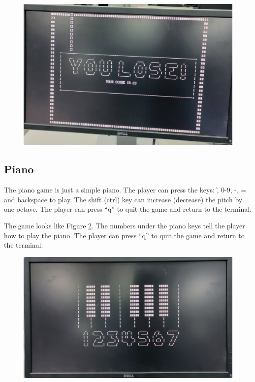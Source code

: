 \documentclass[
	a4paper, %
	11pt, %
]{CSUniSchoolLabReport}
\begin{document}
\begin{figure}[!htb]
    \centering
    \includegraphics[width=12cm]{image5.png}
    \label{fig:image5}
\end{figure}

\subsection{Piano}
The piano game is just a simple piano. The player can press the keys: \`, 0-9, -, = and backspace to play. The shift (ctrl) key can increase (decrease) the pitch by one octave. The player can press ``q'' to quit the game and return to the terminal.

The game looks like Figure \ref{fig:image6}. The numbers under the piano keys tell the player how to play the piano. The player can press ``q'' to quit the game and return to the terminal.

\begin{figure}[!htb]
    \centering
    \includegraphics[width=12cm]{image6.png}
    \label{fig:image6}
\end{figure}
\end{document}
